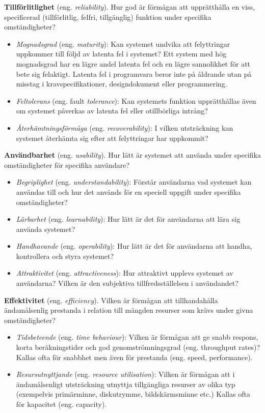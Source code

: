 \textbf{Tillförlitlighet} (eng. \emph{reliability}). Hur god är förmågan
att upprätthålla en viss, specificerad (tillförlitlig, felfri,
tillgänglig) funktion under specifika omständigheter?

\begin{itemize}
\item
  \emph{Mognadsgrad} (eng. \emph{maturity}): Kan systemet undvika att
  felyttringar uppkommer till följd av latenta fel i systemet? Ett
  system med hög mognadsgrad har en lägre andel latenta fel och en lägre
  sannolikhet för att bete sig felaktigt. Latenta fel i programvara
  beror inte på åldrande utan på misstag i kravspecifikationer,
  designdokument eller programmering.
\item
  \emph{Feltolerans} (eng. fault \emph{tolerance}): Kan systemets
  funktion upprätthållas även om systemet påverkas av latenta fel eller
  otillbörliga intrång?
\item
  \emph{Återhämtningsförmåga} (eng. \emph{recoverability}): I vilken
  utsträckning kan systemet återhämta sig efter att felyttringar har
  uppkommit?
\end{itemize}

\textbf{Användbarhet} (eng. \emph{usability}). Hur lätt är systemet att
använda under specifika omständigheter för specifika användare?

\begin{itemize}
\item
  \emph{Begriplighet} (eng. \emph{understandability}): Förstår
  användarna vad systemet kan användas till och hur det används för en
  speciell uppgift under specifika omständigheter?
\item
  \emph{Lärbarhet} (eng. \emph{learnability}): Hur lätt är det för
  användarna att lära sig använda systemet?
\item
  \emph{Handhavande} (eng. \emph{operability}): Hur lätt är det för
  användarna att handha, kontrollera och styra systemet?
\item
  \emph{Attraktivitet} (eng. \emph{attractiveness}): Hur attraktivt
  upplevs systemet av användarna? Vilken är den subjektiva
  tillfredsställelsen i användandet?
\end{itemize}

\textbf{Effektivitet} (eng. \emph{efficiency}). Vilken är förmågan att
tillhandahålla ändamålsenlig prestanda i relation till mängden resurser
som krävs under givna omständigheter?

\begin{itemize}
\item
  \emph{Tidsbeteende} (eng. \emph{time behaviour}): Vilken är förmågan
  att ge snabb respons, korta beräkningstider och god
  genomströmningsgrad (eng. throughput rates)? Kallas ofta för snabbhet
  men även för prestanda (eng. speed, performance).
\item
  \emph{Resursutnyttjande} (eng. \emph{resource utilisation}): Vilken är
  förmågan att i ändamålsenligt utsträckning utnyttja tillgängliga
  resurser av olika typ (exempelvis primärminne, diskutrymme,
  bildskärmsminne etc.) Kallas ofta för kapacitet (eng. capacity).
\end{itemize}

